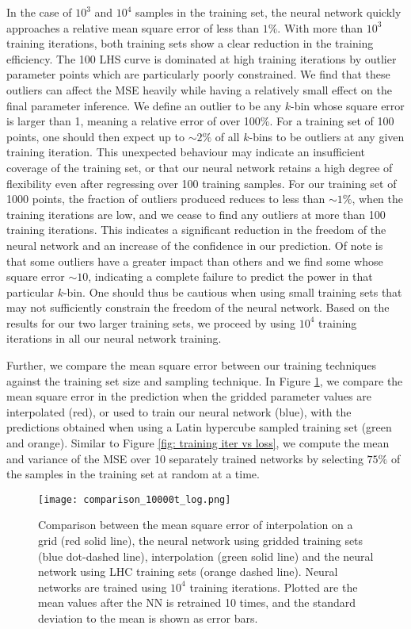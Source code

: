 \documentclass[useAMS,usenatbib]{mnras}
\begin{document}
In the case of $10^3$ and $10^4$ samples in the training set, the neural network quickly approaches a relative mean square error of less than $1\%$.
With more than $10^3$ training iterations, both training sets show a clear reduction in the training efficiency.
The 100 LHS curve is dominated at high training iterations by outlier parameter points which are particularly poorly constrained. 
We find that these outliers can affect the MSE heavily while having a relatively small effect on the final parameter inference. 
We define an outlier to be any $k$-bin whose square error is larger than 1, meaning a relative error of over 100\%. 
For a training set of 100 points, one should then expect up to $\sim 2\%$ of all $k$-bins to be outliers at any given training iteration.
This unexpected behaviour may indicate an insufficient coverage of the training set, or that our neural network retains a high degree of flexibility even after regressing over 100 training samples. 
For our training set of 1000 points, the fraction of outliers produced reduces to less than $\sim 1\%$, when the training iterations are low, and we cease to find any outliers at more than 100 training iterations.
This indicates a significant reduction in the freedom of the neural network and an increase of the confidence in our prediction. 
Of note is that some outliers have a greater impact than others and we find some whose square error $\sim 10$, indicating a complete failure to predict the power in that particular $k$-bin.
One should thus be cautious when using small training sets that may not sufficiently constrain the freedom of the neural network.
Based on the results for our two larger training sets, we proceed by using $10^4$ training iterations in all our neural network training.

Further, we compare the mean square error between our training techniques against the training set size and sampling technique. 
In Figure \ref{fig: comparison of errors}, we compare the mean square error in the prediction when the gridded parameter values are interpolated (red), or used to train our neural network (blue), with the predictions obtained when using a Latin hypercube sampled training set (green and orange).
Similar to Figure \ref{fig: training iter vs loss}, we compute the mean and variance of the MSE over 10 separately trained networks by selecting $75\%$ of the samples in the training set at random at a time. 

\begin{figure}
\texttt{[image: comparison\_10000t\_log.png]}
\caption{Comparison between the mean square error of interpolation on a grid (red solid line), the neural network using gridded training sets (blue dot-dashed line), interpolation (green solid line) and the neural network using LHC training sets (orange dashed line). Neural networks are trained using $10^4$ training iterations. Plotted are the mean values after the NN is retrained 10 times, and the standard deviation to the mean is shown as error bars.}
\label{fig: comparison of errors}
\end{figure}
\end{document}
